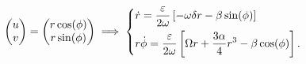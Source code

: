 \begin{ex}
\begin{align}
	\begin{pmatrix}
		u \\v
	\end{pmatrix}
	= 
	\begin{pmatrix}
		r \cos(\phi) \\
		r \sin (\phi)
	\end{pmatrix}
	\implies
	\begin{dcases}
		\dot{r} = \frac{\varepsilon}{2 \omega }\left[ - \omega \delta r - \beta \sin(\phi) \right] \\
		r \dot{\phi} = \frac{\varepsilon}{2 \omega } \left[ \Omega r + \frac{3 \alpha }{4 }r^3 - \beta \cos(\phi) \right].
	\end{dcases}
\end{align}

\end{ex}

